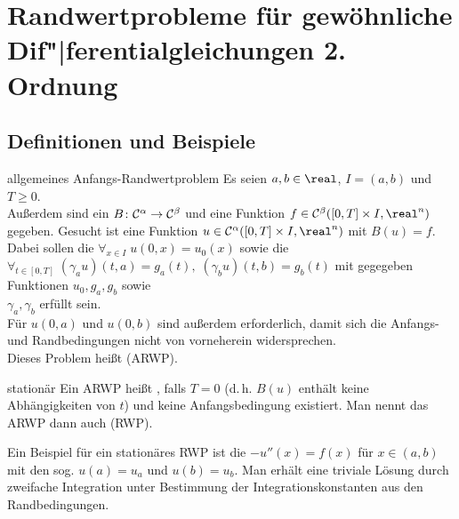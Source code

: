 \section{%
    Randwertprobleme für gewöhnliche Dif"|ferentialgleichungen 2. Ordnung%
}

\subsection{%
    Definitionen und Beispiele%
}

\begin{Def}{allgemeines Anfangs-Randwertproblem}
    Es seien $a, b \in \real$, $I = (a, b)$ und $T \ge 0$.\\
    Außerdem sind ein 
    $B\colon \mathcal{C}^\alpha \rightarrow \mathcal{C}^\beta$ und eine Funktion
    $f \in \C^\beta([0, T] \times I, \real^n)$ gegeben.
    Gesucht ist eine Funktion $u \in \C^\alpha([0, T] \times I, \real^n)$
    mit $B(u) = f$.\\
    Dabei sollen die 
    $\forall_{x \in I}\; u(0, x) = u_0(x)$ sowie die
    \\
    $\forall_{t \in [0, T]}\;
    (\gamma_a u)(t, a) = g_a(t),\;
    (\gamma_b u)(t, b) = g_b(t)$ mit gegegeben Funktionen $u_0, g_a, g_b$
    sowie\\
    $\gamma_a, \gamma_b$ erfüllt sein.\\
    Für $u(0, a)$ und $u(0, b)$ sind außerdem
     erforderlich, damit sich die
    Anfangs- und Randbedingungen nicht von vorneherein widersprechen.\\
    Dieses Problem heißt  (ARWP).
\end{Def}

\begin{Def}{stationär}
    Ein ARWP heißt , falls $T = 0$
    (d.\,h. $B(u)$ enthält keine Abhängigkeiten von $t$)
    und keine Anfangsbedingung existiert.
    Man nennt das ARWP dann auch  (RWP).
\end{Def}

\linie

\begin{Bsp}
    Ein Beispiel für ein stationäres RWP ist die
    $-u''(x) = f(x)$ für $x \in (a, b)$ mit den sog.
    $u(a) = u_a$ und $u(b) = u_b$.
    Man erhält eine triviale Lösung durch zweifache Integration unter
    Bestimmung der Integrationskonstanten aus den Randbedingungen.
\end{Bsp}

